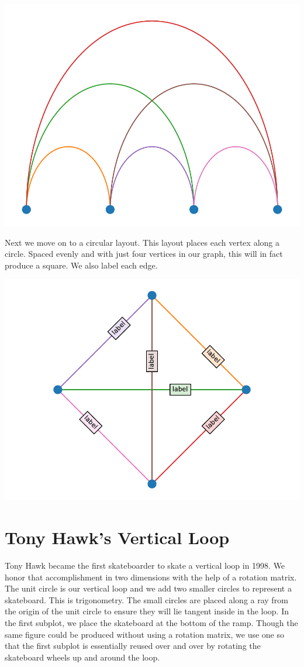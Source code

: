 
\begin{center}
    \includegraphics[width=.7\textwidth]{figures/mathplots/arc-graph.pdf}
\end{center}

Next we move on to a circular layout. This layout places each vertex along a circle. Spaced evenly and with just four vertices in our graph, this will in fact produce a square. We also label each edge. 


\begin{center}
\includegraphics[width = .83\textwidth]{figures/mathplots/circle-graph.pdf}
\end{center}



\section{Tony Hawk's Vertical Loop}

Tony Hawk became the first skateboarder to skate a vertical loop in 1998. We honor that accomplishment in two dimensions with the help of a rotation matrix. The unit circle is our vertical loop and we add two smaller circles to represent a skateboard. This is trigonometry. The small circles are placed along a ray from the origin of the unit circle to ensure they will lie tangent inside in the loop. In the first subplot, we place the skateboard at the bottom of the ramp. Though the same figure could be produced without using a rotation matrix, we use one so that the first subplot is essentially reused over and over by rotating the skateboard wheels up and around the loop.

